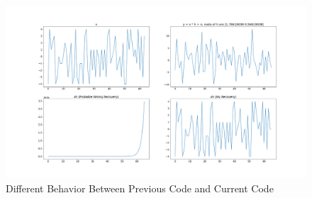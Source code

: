 \documentclass{article}
\begin{document}
\begin{appendices}
\begin{figure}[!h]
	\centering
	\includegraphics[width=6 in]{../pic/diffRec.png}
	\caption{Different Behavior Between Previous Code and Current Code}
	\label{fig:diffRec}
\end{figure}








\end{appendices}
\end{document}
